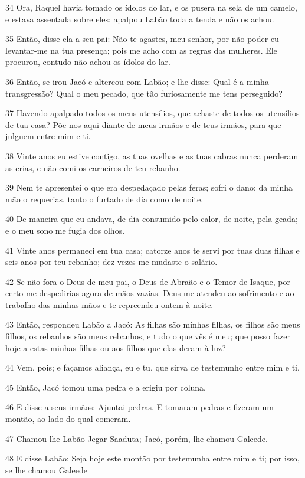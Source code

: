 \par 34 Ora, Raquel havia tomado os ídolos do lar, e os pusera na sela de um camelo, e estava assentada sobre eles; apalpou Labão toda a tenda e não os achou.
\par 35 Então, disse ela a seu pai: Não te agastes, meu senhor, por não poder eu levantar-me na tua presença; pois me acho com as regras das mulheres. Ele procurou, contudo não achou os ídolos do lar.
\par 36 Então, se irou Jacó e altercou com Labão; e lhe disse: Qual é a minha transgressão? Qual o meu pecado, que tão furiosamente me tens perseguido?
\par 37 Havendo apalpado todos os meus utensílios, que achaste de todos os utensílios de tua casa? Põe-nos aqui diante de meus irmãos e de teus irmãos, para que julguem entre mim e ti.
\par 38 Vinte anos eu estive contigo, as tuas ovelhas e as tuas cabras nunca perderam as crias, e não comi os carneiros de teu rebanho.
\par 39 Nem te apresentei o que era despedaçado pelas feras; sofri o dano; da minha mão o requerias, tanto o furtado de dia como de noite.
\par 40 De maneira que eu andava, de dia consumido pelo calor, de noite, pela geada; e o meu sono me fugia dos olhos.
\par 41 Vinte anos permaneci em tua casa; catorze anos te servi por tuas duas filhas e seis anos por teu rebanho; dez vezes me mudaste o salário.
\par 42 Se não fora o Deus de meu pai, o Deus de Abraão e o Temor de Isaque, por certo me despedirias agora de mãos vazias. Deus me atendeu ao sofrimento e ao trabalho das minhas mãos e te repreendeu ontem à noite.
\par 43 Então, respondeu Labão a Jacó: As filhas são minhas filhas, os filhos são meus filhos, os rebanhos são meus rebanhos, e tudo o que vês é meu; que posso fazer hoje a estas minhas filhas ou aos filhos que elas deram à luz?
\par 44 Vem, pois; e façamos aliança, eu e tu, que sirva de testemunho entre mim e ti.
\par 45 Então, Jacó tomou uma pedra e a erigiu por coluna.
\par 46 E disse a seus irmãos: Ajuntai pedras. E tomaram pedras e fizeram um montão, ao lado do qual comeram.
\par 47 Chamou-lhe Labão Jegar-Saaduta; Jacó, porém, lhe chamou Galeede.
\par 48 E disse Labão: Seja hoje este montão por testemunha entre mim e ti; por isso, se lhe chamou Galeede
